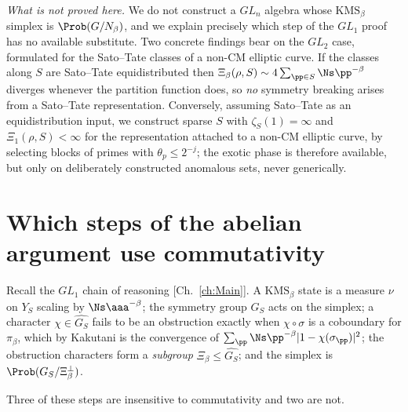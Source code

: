 \begin{summary}
\emph{What is not proved here.} We do not construct a $GL_n$ algebra whose
$\mathrm{KMS}_\beta$ simplex is $\Prob(G/N_\beta)$, and we explain precisely which step of
the $GL_1$ proof has no available substitute. Two concrete findings bear on the $GL_2$ case,
formulated for the Sato--Tate classes of a non-CM elliptic curve. If the classes along $S$
are Sato--Tate equidistributed then $\Xi_\beta(\rho,S)\sim4\sum_{\pp\in S}\Ns\pp^{-\beta}$
diverges whenever the partition function does, so \emph{no} symmetry breaking arises from a
Sato--Tate representation. Conversely, assuming Sato--Tate as an equidistribution input, we
construct sparse $S$ with $\zeta_S(1)=\infty$ and $\Xi_1(\rho,S)<\infty$ for the
representation attached to a non-CM elliptic curve, by selecting blocks of primes with
$\theta_p\le2^{-j}$; the exotic phase is therefore available, but only on deliberately
constructed anomalous sets, never generically.
\end{summary}

\section{Which steps of the abelian argument use commutativity}

Recall the $GL_1$ chain of reasoning [Ch.~\ref{ch:Main}]. A $\mathrm{KMS}_\beta$ state is a measure
$\nu$ on $Y_S$ scaling by $\Ns\aaa^{-\beta}$; the symmetry group $G_S$ acts on the simplex;
a character $\chi\in\widehat{G_S}$ fails to be an obstruction exactly when $\chi\circ\sigma$
is a coboundary for $\pi_\beta$, which by Kakutani is the convergence of
$\sum_\pp\Ns\pp^{-\beta}|1-\chi(\sigma_\pp)|^2$; the obstruction characters form a
\emph{subgroup} $\Xi_\beta\le\widehat{G_S}$; and the simplex is
$\Prob(G_S/\Xi_\beta^\perp)$.

Three of these steps are insensitive to commutativity and two are not.

